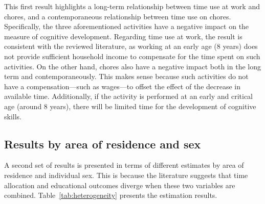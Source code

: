 \documentclass[12pt]{article}
\begin{document}
This first result highlights a long-term relationship between time use at work
and chores, and a contemporaneous relationship between time use on chores.
Specifically, the three aforementioned activities have a negative impact on
the measure of cognitive development. Regarding time use at work, the result
is consistent with the reviewed literature, as working at an early age (8
years) does not provide sufficient household income to compensate for the time
spent on such activities. On the other hand, chores also have a negative
impact both in the long term and contemporaneously. This makes sense because
such activities do not have a compensation—such as wages—to offset the effect
of the decrease in available time. Additionally, if the activity is performed
at an early and critical age (around 8 years), there will be limited time for
the development of cognitive skills.

\subsection{Results by area of residence and sex}
\label{subsec:heterogeneity}

A second set of results is presented in terms of different estimates by area
of residence and individual sex. This is because the literature suggests that
time allocation and educational outcomes diverge when these two variables are
combined. Table~\ref{tab:heterogeneity} presents the estimation results.
\end{document}
